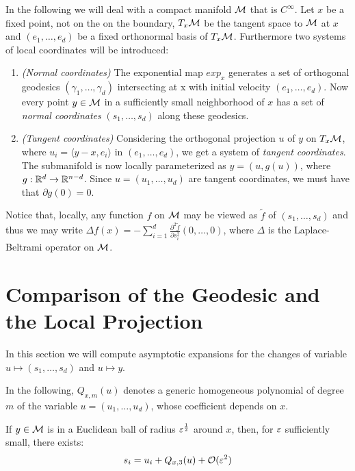 In the following we will deal with a compact manifold $\mathcal{M}$ that is $C^\infty$. Let $x$ be a fixed point, not on the on the boundary, $T_x\mathcal{M}$ be the tangent space to $\mathcal{M}$ at $x$ and $(e_1,\dots,e_d)$ be a fixed orthonormal basis of $T_x\mathcal{M}$. Furthermore two systems of local coordinates will be introduced:
\begin{enumerate}
\item \textit{(Normal coordinates)} The exponential map $exp_x$ generates a set of orthogonal geodesics $(\gamma_1,\dots,\gamma_d)$ intersecting at x with initial velocity $(e_1,\dots,e_d)$. Now every point $y\in\mathcal{M}$ in a sufficiently small neighborhood of $x$ has a set of \textit{normal coordinates} $(s_1,\dots,s_d)$ along these geodesics.
\item \textit{(Tangent coordinates)} Considering the orthogonal projection $u$ of $y$ on $T_x\mathcal{M}$, where $u_i = \langle y-x,e_i\rangle$ in $(e_1,\dots,e_d)$, we get a system of \textit{tangent coordinates}. The submanifold is now locally parameterized as $y=(u,g(u))$, where $g:\mathbb{R}^d \rightarrow \mathbb{R}^{n-d}$. Since $u=(u_1,\dots,u_d)$ are tangent coordinates, we must have that $\partial g(0)=0$.
\end{enumerate}
Notice that, locally, any function $f$ on $\mathcal{M}$ may be viewed as $\tilde{f}$ of $(s_1,\dots,s_d)$ and thus we may write $\Delta f(x)=-\sum_{i=1}^d \frac{\partial^2\tilde{f}}{\partial s_i^2}(0,\dots,0)$, where $\Delta$ is the Laplace-Beltrami operator on $\mathcal{M}$.



\section{Comparison of the Geodesic and the Local Projection}
In this section we will compute asymptotic expansions for the changes of variable $u\mapsto (s_1,\dots,s_d)$ and $u\mapsto y$.

In the following, $Q_{x,m}(u)$ denotes a generic homogeneous polynomial of degree $m$ of the variable $u = (u_1,\dots,u_d)$, whose coefficient depends on $x$.

\begin{lemma}
If $y\in\mathcal{M}$ is in a Euclidean ball of radius $\varepsilon^\frac{1}{2}$ around $x$, then, for $\varepsilon$ sufficiently small, there exists:
\begin{equation}\label{geodOrder3}
s_i=u_i+Q_{x,3}(u)+\mathcal{O}(\varepsilon^2)
\end{equation}
\end{lemma}

